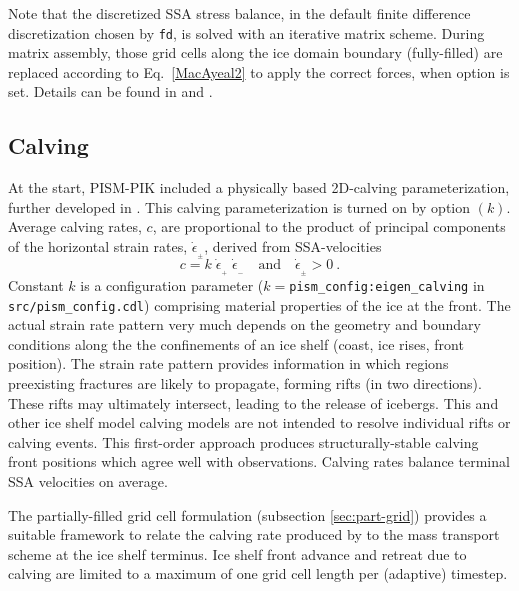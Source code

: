 Note that the discretized SSA stress balance, in the default finite difference discretization chosen by  \texttt{fd}, is solved with an iterative matrix scheme. During matrix assembly, those grid cells along the ice domain boundary (fully-filled) are replaced according to Eq.~\eqref{MacAyeal2} to apply the correct forces, when option  is set.  Details can be found in \cite{Winkelmannetal2010TCD} and \cite{Albrechtetal2011}.  

\subsection{Calving}
\label{sec:calving}
At the start, PISM-PIK included a physically based 2D-calving parameterization, further developed in \cite{LevermannAlbrecht11}. This calving parameterization is turned on by option  $(k)$.  Average calving rates, $c$, are proportional to the product of principal components of the horizontal strain rates, $\dot{\epsilon}_{_\pm}$, derived from SSA-velocities 
\begin{equation}
\label{eq: calv2}
c = k\; \dot{\epsilon}_{_+}\; \dot{\epsilon}_{_-}\quad\text{and}\quad\dot{\epsilon}_{_\pm}>0\:.
\end{equation}
Constant $k$ is a configuration parameter ($k=$\texttt{pism_config:eigen_calving} in \texttt{src/pism_config.cdl}) comprising material properties of the ice at the front. The actual strain rate pattern very much depends on the geometry and boundary conditions along the the confinements of an ice shelf (coast, ice rises, front position).  The strain rate pattern provides information in which regions preexisting fractures are likely to propagate, forming rifts (in two directions).  These rifts may ultimately intersect, leading to the release of icebergs. This and other ice shelf model calving models are not intended to resolve individual rifts or calving events. This first-order approach produces structurally-stable calving front positions which agree well with observations.  Calving rates balance terminal SSA velocities on average.

The partially-filled grid cell formulation (subsection \ref{sec:part-grid}) provides a suitable framework to relate the calving rate produced by  to the mass transport scheme at the ice shelf terminus.  Ice shelf front advance and retreat due to calving are limited to a maximum of one grid cell length per (adaptive) timestep.

